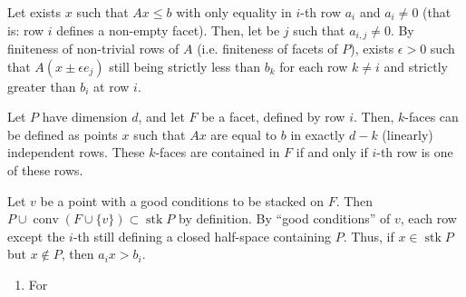 \documentclass[11pt]{amsart}
\DeclareMathOperator{\conv}{conv}
\DeclareMathOperator{\stack}{stk}
\begin{document}
\begin{enumerate}
       Let exists $x$ such that $Ax \leq b$ with only equality in $i$-th row $a_i$ and $a_i\neq 0$ (that is: row $i$ defines a non-empty facet). Then, let be $j$ such that $a_{i,j}\neq 0$. By finiteness of non-trivial rows of $A$ (i.e. finiteness of facets of $P$), exists $\epsilon >0$ such that $A(x\pm\epsilon e_j)$ still being strictly less than $b_k$ for each row $k\neq i$ and strictly greater than $b_i$ at row $i$.
       
       Let $P$ have dimension $d$, and let $F$ be a facet, defined by row $i$. Then, $k$-faces can be defined as points $x$ such that $Ax$ are equal to $b$ in exactly $d-k$ (linearly) independent rows. These $k$-faces are contained in $F$ if and only if $i$-th row is one of these rows.
       
       Let $v$ be a point with a good conditions to be stacked on $F$. Then $P \cup \conv(F\cup \{v\}) \subset \stack P$ by definition. By ``good conditions'' of $v$, each row except the $i$-th still defining a closed half-space containing $P$. Thus, if $x\in \stack{P}$ but $x\notin P$, then $a_ix>b_i$.
       
       \begin{enumerate}
         \item For
       \end{enumerate}
       
     \end{enumerate}
  
\end{document}
